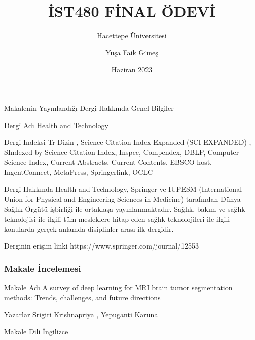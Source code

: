 \documentclass[10pt,xcolor=dvipsnames]{beamer}
\title{İST480 FİNAL ÖDEVİ}
\subtitle{Hacettepe Üniversitesi}
\date{Haziran 2023}
\author{Yuşa Faik Güneş}
\institute{}
\begin{document}
\maketitle

\begin{frame}{Makalenin Yayınlandığı Dergi Hakkında Genel Bilgiler}
\begin{block}{Dergi Adı}
Health and Technology
\end{block}


\begin{block}{Dergi Indeksi}
Tr Dizin , Science Citation Index Expanded (SCI-EXPANDED) , SIndexed by Science Citation Index, Inspec, Compendex, DBLP, Computer Science Index, Current Abstracts, Current Contents, EBSCO host, IngentConnect, MetaPress, Springerlink, OCLC
\end{block}

  
  \begin{block}{Dergi Hakkında}
  Health and Technology, Springer ve IUPESM (International Union for Physical and Engineering Sciences in Medicine) tarafından Dünya Sağlık Örgütü işbirliği ile ortaklaşa yayınlanmaktadır. Sağlık, bakım ve sağlık teknolojisi ile ilgili tüm mesleklere hitap eden sağlık teknolojileri ile ilgili konularda gerçek anlamda disiplinler arası ilk dergidir.

  \end{block}
  \begin{block}{Derginin erişim linki}
https://www.springer.com/journal/12553
 \end{block}
  
\end{frame}

\begin{frame}
\frametitle{Makale İncelemesi}


\begin{block}{Makale Adı}
A survey of deep learning for MRI brain tumor segmentation methods: Trends, challenges, and future directions
\end{block}

\begin{block}{Yazarlar}
Srigiri Krishnapriya , Yepuganti Karuna 
\end{block}

\begin{block}{Makale Dili}
İngilizce
\end{block}

\end{frame}
\end{document}
